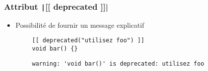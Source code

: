 \documentclass[C++.tex]{subfiles}
\begin{document}
\begin{frame}[fragile]
	\frametitle{Attribut \texttt|[[ deprecated ]]|}
	\begin{itemize}
		\item Possibilité de fournir un message explicatif
	\end{itemize}

	\begin{verbatim}
		[[ deprecated("utilisez foo") ]]
		void bar() {}
	\end{verbatim}

	\begin{verbatim}
		warning: 'void bar()' is deprecated: utilisez foo
	\end{verbatim}

\end{frame}
\end{document}
